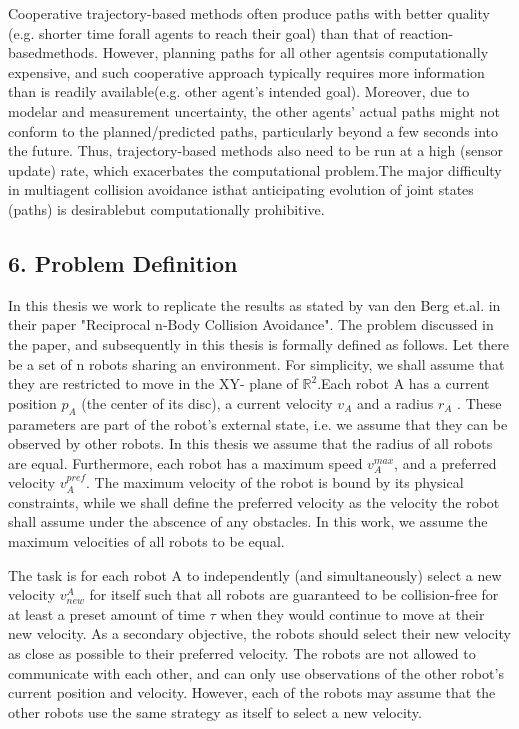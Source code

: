 \documentclass[12pt]{report}
\begin{document}
Cooperative trajectory-based methods often produce paths with better quality (e.g. shorter time forall  agents to reach their goal) than  that  of reaction-basedmethods. However, planning paths for all other agentsis computationally expensive, and such cooperative approach typically requires more information than is readily available(e.g. other agent’s intended goal). Moreover, due to modelar and measurement uncertainty, the other agents’ actual paths might not conform to the planned/predicted paths, particularly beyond a few seconds into the future. Thus, trajectory-based methods also need to be run at a high (sensor update) rate, which exacerbates the computational problem.The major difficulty in multiagent collision avoidance isthat anticipating evolution of joint states (paths) is desirablebut computationally prohibitive. 



\begin{center}
\chapter*{6.  Problem Definition}
\end{center}


In this thesis we work to replicate the results as stated by van den Berg et.al. in their paper "Reciprocal n-Body Collision Avoidance". The problem discussed in the paper, and subsequently in this thesis is formally defined as follows. Let there be a set of n robots sharing an environment. For simplicity, we shall assume that they are restricted to move in the XY- plane of $\mathbb{R}^{2}$.Each robot A has a current position $p_{A}$ (the center of its disc), a current velocity $v_{A}$ and a radius $r_{A}$ . These parameters are part of the robot’s external state, i.e. we assume that they can be observed by other robots. In this thesis we assume that the radius of all robots are equal. Furthermore, each robot has a maximum speed $v_{A}^{max}$, and a preferred velocity $v_{A}^{pref}$. The maximum velocity of the robot is bound by its physical constraints, while we shall define the preferred velocity as the velocity the robot shall assume under the abscence of any obstacles. In this work, we assume the maximum velocities of all robots to be equal.

The task is for each robot A to independently (and simultaneously) select a new
velocity $v_{new}^{A}$ for itself such that all robots are guaranteed to be collision-free for at least a preset amount of time $\tau$ when they would continue to move at their new velocity. As a secondary objective, the robots should select their new velocity as close as possible to their preferred velocity. The robots are not allowed to communicate with each other, and can only use observations of the other robot’s current position and velocity. However, each of the robots may assume that the other robots use the same strategy as itself to select a new velocity.
\end{document}
